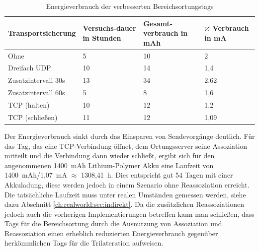 \begin{table}[h]
	\centering
	\caption{Energieverbrauch der verbesserten Bereichsortungstags}
	\label{table:naiveoptconsumption}
	\begin{tabular}{p{3.5cm}|p{1.7cm}|p{2.5cm}|p{2.5cm}}
		Transportsicherung & Versuchs-dauer in Stunden & Gesamt-verbrauch in mAh & $\varnothing$ Verbrauch in mA \\
		\hline
		Ohne & 5 & 10 & 2 \\
		Dreifach UDP & 10 & 14 & 1,4 \\
		Zusatzintervall 30s & 13 & 34 & 2,62 \\
		Zusatzintervall 60s & 5 & 8 & 1,6 \\
		TCP (halten) & 10 & 12 & 1,2 \\
		TCP (schließen) & 11 & 12 & 1,09 \\
	\end{tabular}
\end{table}

Der Energieverbrauch sinkt durch das Einsparen von Sendevorgänge deutlich.
Für das Tag, das eine TCP-Verbindung öffnet, dem Ortungsserver seine Assoziation mitteilt und die Verbindung dann wieder schließt, ergibt sich für den angenommenen 1400\ mAh Lithium-Polymer Akku eine Laufzeit von 1400\ mAh/1,07\ mA $\approx$ 1308,41\ h. 
Dies entspricht gut 54 Tagen mit einer Akkuladung, diese werden jedoch in einem Szenario ohne Reassoziation erreicht.
Die tatsächliche Laufzeit muss unter realen Umständen gemessen werden, siehe dazu Abschnitt \ref{ch:realworld:sec:indirekt}.
Da die zusätzlichen Reassoziationen jedoch auch die vorherigen Implementierungen betreffen kann man schließen, dass Tags für die Bereichsortung durch die Ausnutzung von Assoziation und Reassoziation einen erheblich reduzierten Energieverbrauch gegenüber herkömmlichen Tags für die Trilateration aufweisen.




